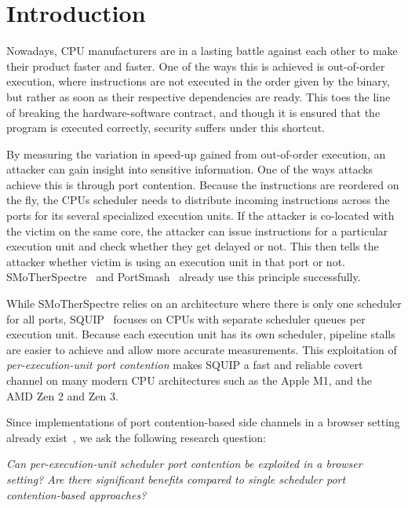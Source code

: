 \documentclass[11pt,
  titlepage=false,
]{scrreprt}
\begin{document}
\clearpage



\chapter{Introduction}
\label{ch:introduction}

Nowadays, CPU manufacturers are in a lasting battle against each other to make their product faster and faster.
One of the ways this is achieved is out-of-order execution, where instructions are not executed in the order given by the binary, but rather as soon as their respective dependencies are ready.
This toes the line of breaking the hardware-software contract, and though it is ensured that the program is executed correctly, security suffers under this shortcut.

By measuring the variation in speed-up gained from out-of-order execution, an attacker can gain insight into sensitive information.
One of the ways attacks achieve this is through port contention.
Because the instructions are reordered on the fly, the CPUs scheduler needs to distribute incoming instructions across the ports for its several specialized execution units.
If the attacker is co-located with the victim on the same core, the attacker can issue instructions for a particular execution unit and check whether they get delayed or not.
This then tells the attacker whether victim is using an execution unit in that port or not.
SMoTherSpectre~\cite{Bhattacharyya2019} and PortSmash~\cite{Aldaya2019port} already use this principle successfully.

While SMoTherSpectre relies on an architecture where there is only one scheduler for all ports, SQUIP~\cite{squip} focuses on CPUs with separate scheduler queues per execution unit.
Because each execution unit has its own scheduler, pipeline stalls are easier to achieve and allow more accurate measurements.
This exploitation of \textit{per-execution-unit port contention} makes SQUIP a fast and reliable covert channel on many modern CPU architectures such as the Apple M1, and the AMD Zen 2 and Zen 3.

Since implementations of port contention-based side channels in a browser setting already exist~\cite{Rokicki2022webport}, we ask the following research question:

\textit{Can per-execution-unit scheduler port contention be exploited in a browser setting? Are there significant benefits compared to single scheduler port contention-based approaches?}
\end{document}
